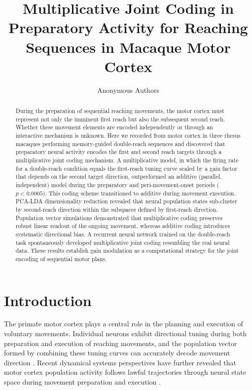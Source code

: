 \documentclass[12pt]{article}
\title{Multiplicative Joint Coding in Preparatory Activity for Reaching Sequences in Macaque Motor Cortex}
\author{Anonymous Authors}
\date{}
\begin{document}
\maketitle

\begin{abstract}
During the preparation of sequential reaching movements, the motor cortex must represent not only the imminent first reach but also the subsequent second reach. Whether these movement elements are encoded independently or through an interactive mechanism is unknown. Here we recorded from motor cortex in three rhesus macaques performing memory-guided double-reach sequences and discovered that preparatory neural activity encodes the first and second reach targets through a multiplicative joint coding mechanism. A multiplicative model, in which the firing rate for a double-reach condition equals the first-reach tuning curve scaled by a gain factor that depends on the second target direction, outperformed an additive (parallel, independent) model during the preparatory and peri-movement-onset periods ($p < 0.0005$). This coding scheme transitioned to additive during movement execution. PCA-LDA dimensionality reduction revealed that neural population states sub-cluster by second-reach direction within the subspaces defined by first-reach direction. Population vector simulations demonstrated that multiplicative coding preserves robust linear readout of the ongoing movement, whereas additive coding introduces systematic directional bias. A recurrent neural network trained on the double-reach task spontaneously developed multiplicative joint coding resembling the real neural data. These results establish gain modulation as a computational strategy for the joint encoding of sequential motor plans.
\end{abstract}

\section{Introduction}

The primate motor cortex plays a central role in the planning and execution of voluntary movements. Individual neurons exhibit directional tuning during both preparation and execution of reaching movements, and the population vector formed by combining these tuning curves can accurately decode movement direction \citep{georgopoulos1982relations}. Recent dynamical systems perspectives have further revealed that motor cortex population activity follows lawful trajectories through neural state space during movement preparation and execution \citep{churchland2012neural, shenoy2013cortical}.
\end{document}
